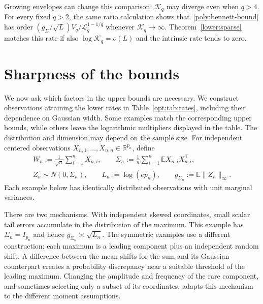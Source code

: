 \documentclass[11pt,letterpaper]{article}
\theoremstyle{remark}
\newcommand{\E}{\mathbb E}
\newcommand{\R}{\mathbb R}
\begin{document}
Growing envelopes can change this comparison: $\mathcal K_q$ may
diverge even when $q>4$. For every fixed $q>2$, the same ratio
calculation shows that~\eqref{poly:bennett-bound} has order
$(g_\Sigma/\sqrt L)V_q/\mathcal L_q^{1-1/q}$ whenever
$\mathcal K_q\to\infty$.
Theorem~\ref{lower:sparse} matches this rate if also
$\log\mathcal K_q=o(L)$ and the intrinsic rate tends to zero.

\section{Sharpness of the bounds}\label{opt:section}

We now ask which factors in the upper bounds are necessary. We
construct observations attaining the lower rates in
Table~\ref{opt:tab:rates}, including their dependence on Gaussian
width. Some examples match the corresponding upper bounds, while
others leave the logarithmic multipliers displayed in the table.
The distribution and dimension may depend on the sample size.
For independent centered observations
$X_{n,1},\ldots,X_{n,n}\in\R^{p_n}$, define
\begin{equation}
\begin{gathered}
 W_n:=\frac1{\sqrt n}\sum_{i=1}^nX_{n,i},\qquad
 \Sigma_n:=\frac1n\sum_{i=1}^n\E X_{n,i}X_{n,i}^{\top},\\
 Z_n\sim N(0,\Sigma_n),\qquad
 L_n:=\log(ep_n),\qquad g_{\Sigma_n}:=\E\|Z_n\|_\infty.
\end{gathered}
\label{lower:eq:setup}
\end{equation}
Each example below has identically distributed observations with unit
marginal variances.

There are two mechanisms. With independent skewed coordinates,
small scalar tail errors accumulate in the distribution of the
maximum. This example has $\Sigma_n=I_{p_n}$ and hence
$g_{\Sigma_n}\asymp\sqrt{L_n}$.
The symmetric examples use a different construction: each maximum
is a leading component plus an independent random shift. A difference
between the mean shifts for the sum and its Gaussian counterpart
creates a probability discrepancy near a suitable threshold of the
leading maximum. Changing the amplitude and frequency of the rare
component, and sometimes selecting only a subset of its coordinates,
adapts this mechanism to the different moment assumptions.
\end{document}
